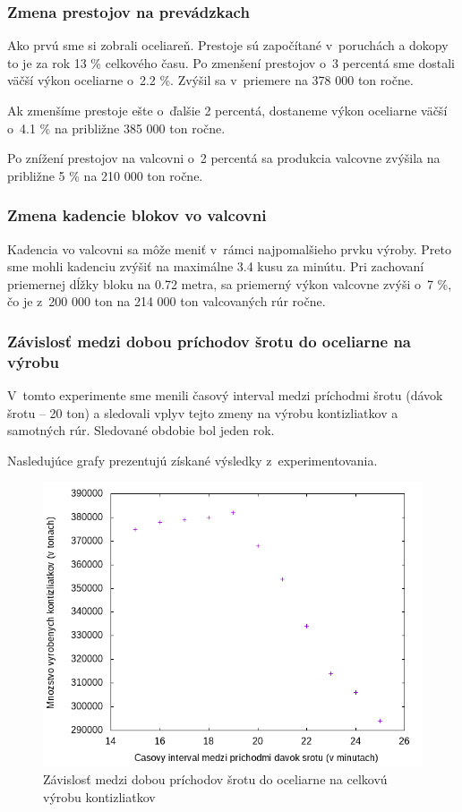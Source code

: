 \documentclass[]{article}
\begin{document}
\subsubsection{Zmena prestojov na prevádzkach}
Ako prvú sme si zobrali oceliareň. Prestoje sú započítané v~poruchách a dokopy to je za rok 13 \% celkového času. Po zmenšení prestojov o~3 percentá sme dostali väčší výkon oceliarne o~2.2 \%. Zvýšil sa v~priemere na 378 000 ton ročne.

Ak zmenšíme prestoje ešte o~ďalšie 2 percentá, dostaneme výkon oceliarne väčší o~4.1 \% na približne 385 000 ton ročne.

Po znížení prestojov na valcovni o~2 percentá sa produkcia valcovne zvýšila na približne 5 \% na 210 000 ton ročne.

\subsubsection{Zmena kadencie blokov vo valcovni}
Kadencia vo valcovni sa môže meniť v~rámci najpomalšieho prvku výroby. Preto sme mohli kadenciu zvýšiť na maximálne 3.4 kusu za minútu. Pri zachovaní priemernej dĺžky bloku na 0.72 metra, sa priemerný výkon valcovne zvýši o~7 \%, čo je z~200 000 ton na 214 000 ton valcovaných rúr ročne.

\newpage

\subsubsection{Závislosť medzi dobou príchodov šrotu do oceliarne na výrobu}
V~tomto experimente sme menili časový interval medzi príchodmi šrotu (dávok šrotu -- 20 ton) a sledovali vplyv tejto zmeny na výrobu kontizliatkov a samotných rúr. Sledované obdobie bol jeden rok.

Nasledujúce grafy prezentujú získané výsledky z~experimentovania.
\begin{figure}[h!]
	\includegraphics[width=\textwidth]{prichody_srotu_konti.png}
	\caption{Závislosť medzi dobou príchodov šrotu do oceliarne na celkovú výrobu kontizliatkov}
\end{figure}
\end{document}
